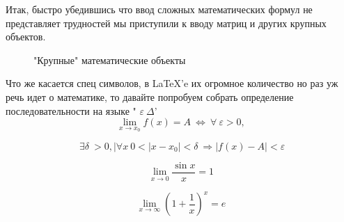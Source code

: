\documentclass{beamer}[aspectratio=169]
\begin{document}
\begin{frame}
\transwipe
Итак, быстро убедившись что ввод сложных математических формул не представляет трудностей мы приступили к вводу матриц и других крупных объектов.
\begin{figure}[h!]
\setlength{\fboxsep}{0pt}%
\setlength{\fboxrule}{1pt}%
%
\caption{"Крупные" математические объекты}
\end{figure}
\end{frame}



\begin{frame}
\transwipe
Что же касается спец символов, в \LaTeX 'e их огромное количество но раз уж речь идет о математике, то давайте попробуем собрать определение последовательности на языке " $\varepsilon \ \Delta $'
$$\lim_{x \rightarrow x_0}f(x) = A \  \Leftrightarrow \   \forall \ \varepsilon > 0,$$

$$\ \exists \delta \ >0, |\forall x \ 0<|x-x_0|<\delta \ \Rightarrow |f(x) - A|< \varepsilon   $$


$$\lim_{x \rightarrow 0}\frac{\sin x}{x} = 1  $$

$$\lim_{x \rightarrow \infty} \left( 1 + \frac{1}{x} \right)^x = e  $$


\end{frame}
\end{document}
